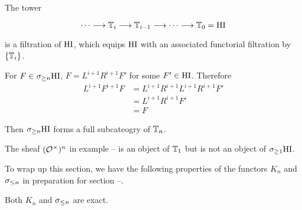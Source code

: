 \begin{thm}
The tower

\begin{equation}
\cdots \longrightarrow \mathbb{T}_i \longrightarrow \mathbb{T}_{i-1} 
\longrightarrow \cdots \longrightarrow \mathbb{T}_0 = \mathrm{HI}
\end{equation}

is a filtration of $\mathrm{HI}$, which equips $\mathrm{HI}$ with an associated 
functorial filtration by $\left\{ \mathbb{T}_i \right\}$.
\end{thm}

\begin{ex}
For $F \in \sigma_{\geq n} \mathrm{HI}$, $F=L^{i+1}R^{i+1}F'$ for some $F' \in 
\mathrm{HI}$. Therefore 
\begin{align*}
L^{i+1}F^{i+1}F &= L^{i+1}R^{i+1}L^{i+1}R^{i+1}F' \\
&= L^{i+1}R^{i+1}F' \\
&= F
\end{align*}

Then $\sigma_{\geq n} \mathrm{HI}$ forms a full subcateogry of $\mathbb{T}_n$.
\end{ex}

\begin{ex}
The sheaf $(\mathcal{O}^{\times})^n$ in example -- is an object of $\mathbb{T}_1$
but is not an object of $\sigma_{\geq 1} \mathrm{HI}$.
\end{ex}

To wrap up this section, we have the following properties of the 
functors $K_n$ and $\sigma_{\leq n}$ in preparation for section --.

\begin{prop}
Both $K_n$ and $\sigma_{\leq n}$ are exact.
\end{prop}

